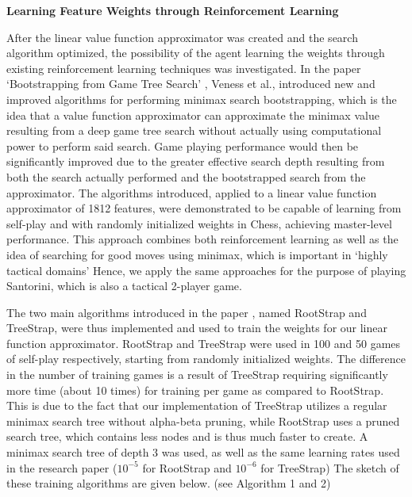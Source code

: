 \documentclass[a4paper,12pt,table]{article}
\begin{document}
\textbf{Learning Feature Weights through Reinforcement Learning}
\newline

After the linear value function approximator was created and the search algorithm optimized, the possibility of the agent learning the weights through existing reinforcement learning techniques was investigated. In the paper ‘Bootstrapping from Game Tree Search’ \cite{Bootstrapping from Game Tree Search}, Veness et al., introduced new and improved algorithms for performing minimax search bootstrapping, which is the idea that a value function approximator can approximate the minimax value resulting from a deep game tree search without actually using computational power to perform said search. Game playing performance would then be significantly improved due to the greater effective search depth resulting from both the search actually performed and the bootstrapped search from the approximator. The algorithms introduced, applied to a linear value function approximator of 1812 features, were demonstrated to be capable of learning from self-play and with randomly initialized weights in Chess, achieving master-level performance.  This approach combines both reinforcement learning as well as the idea of searching for good moves using minimax, which is important in ‘highly tactical domains’ Hence, we apply the same approaches for the purpose of playing Santorini, which is also a tactical 2-player game. \par

The two main algorithms introduced in the paper \cite{Bootstrapping from Game Tree Search}, named RootStrap and TreeStrap, were thus implemented and used to train the weights for our linear function approximator. RootStrap and TreeStrap were used in 100 and 50 games of self-play respectively, starting from randomly initialized weights. The difference in the number of training games is a result of TreeStrap requiring significantly more time (about 10 times) for training per game as compared to RootStrap. This is due to the fact that our implementation of TreeStrap utilizes a regular minimax search tree without alpha-beta pruning, while RootStrap uses a pruned search tree, which contains less nodes and is thus much faster to create. A minimax search tree of depth 3 was used, as well as the same learning rates used in the research paper ($10^{-5}$ for RootStrap and $10^{-6}$ for TreeStrap) The sketch of these training algorithms are given below. (see Algorithm 1 and 2) \par
\end{document}

